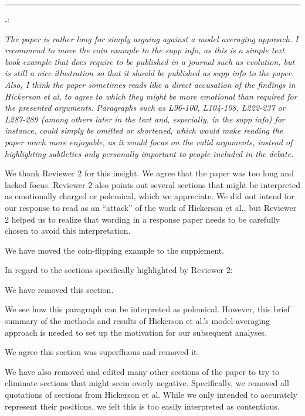 \documentclass[12pt]{article}
\newcounter{commentCounter}
\newcommand{\revcomment}[1]{{\addtocounter{commentCounter}{1}}
    \medskip \hrule \noindent
\textbf{\arabic{section}.\arabic{commentCounter}}: {\sl #1}\par\xspace}
\newcommand{\response}[1]{{\addtolength{\leftskip}{0.25in} #1\par}\xspace}
\begin{document}
\revcomment{
    The paper is rather long for simply arguing against a model averaging
    approach. I recommend to move the coin example to the supp info, as this is
    a simple text book example that does require to be published in a journal
    such as evolution, but is still a nice illustration so that it should be
    published as supp info to the paper. Also, I think the paper sometimes
    reads like a direct accusation of the findings in Hickerson et al, to agree
    to which they might be more emotional than required for the presented
    arguments. Paragraphs such as L96-100, L104-108, L222-237 or L287-289
    (among others later in the text and, especially, in the supp info) for
    instance, could simply be omitted or shortened, which would make reading
    the paper much more enjoyable, as it would focus on the valid arguments,
    instead of highlighting subtleties only personally important to people
    included in the debate.
    
}
\response{
    We thank Reviewer 2 for this insight. We agree that the paper was too long
    and lacked focus. Reviewer 2 also points out several sections that might be
    interpreted as emotionally charged or polemical, which we appreciate. We
    did not intend for our response to read as an ``attack'' of the work of
    Hickerson et al., but Reviewer 2 helped us to realize that wording in a
    response paper needs to be carefully chosen to avoid this interpretation.

    We have moved the coin-flipping example to the supplement.

    In regard to the sections specifically highlighted by Reviewer 2:
    \begin{description}[align=left,labelindent=0.5in,leftmargin=0.75in]
        \item[L96-100 and L104-108]
            We have removed this section.
        \item[L222-237]
            We see how this paragraph can be interpreted as polemical. However,
            this brief summary of the methods and results of Hickerson et al.'s
            model-averaging approach is needed to set up the motivation for our
            subsequent analyses.
        \item[L287-289]
            We agree this section was superfluous and removed it.
    \end{description}
    
    We have also removed and edited many other sections of the paper to try to
    eliminate sections that might seem overly negative. Specifically, we
    removed all quotations of sections from Hickerson et al. While we only
    intended to accurately represent their positions, we felt this is too
    easily interpreted as contentious.
}
\end{document}
